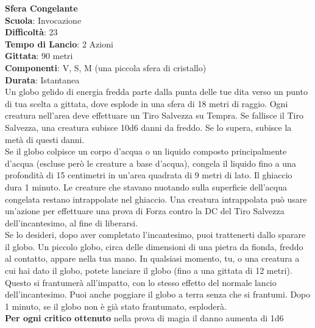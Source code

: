 \begin{multicols}{2}
\medskip\textbf{Sfera Congelante}\\
\textbf{Scuola}: Invocazione\\
\textbf{Difficoltà}:  23\\
\textbf{Tempo di Lancio}: 2 Azioni\\
\textbf{Gittata}: 90 metri\\
\textbf{Componenti}: V, S, M (una piccola sfera di cristallo)\\
\textbf{Durata}: Istantanea\\
Un globo gelido di energia fredda parte dalla punta delle tue dita verso un punto di tua scelta a gittata, dove esplode in una sfera di 18 metri di raggio. Ogni creatura nell'area deve effettuare un Tiro Salvezza su Tempra. Se fallisce il Tiro Salvezza, una creatura subisce 10d6 danni da freddo. Se lo supera, subisce la metà di questi danni.\\
Se il globo colpisce un corpo d’acqua o un liquido composto principalmente d’acqua (escluse però le creature a base d’acqua), congela il liquido fino a una profondità di 15 centimetri in un'area quadrata di 9 metri di lato. Il ghiaccio dura 1 minuto. Le creature che stavano nuotando sulla superficie dell'acqua congelata restano intrappolate nel ghiaccio. Una creatura intrappolata può usare un'azione per effettuare una prova di Forza contro la DC del Tiro Salvezza dell'incantesimo, al fine di liberarsi.\\
Se lo desideri, dopo aver completato l'incantesimo, puoi trattenerti dallo sparare il globo. Un piccolo globo, circa delle dimensioni di una pietra da fionda, freddo al contatto, appare nella tua mano. In qualsiasi momento, tu, o una creatura a cui hai dato il globo, potete lanciare il globo (fino a una gittata di 12 metri). Questo si frantumerà all'impatto, con lo stesso effetto del normale lancio dell'incantesimo. Puoi anche poggiare il globo a terra senza che si frantumi. Dopo 1 minuto, se il globo non è già stato frantumato, esploderà.\\
\textbf{Per ogni critico ottenuto} nella prova di magia il danno aumenta di 1d6


\end{multicols}

